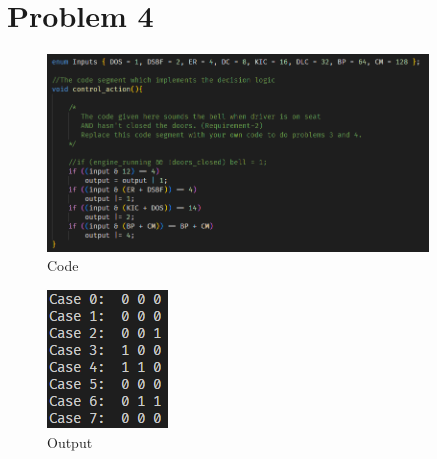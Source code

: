 \clearpage
\section*{Problem 4}
\begin{figure}[!ht]
    \centering
    \includegraphics[width=0.9\textwidth]{Images/4a Code.png}
    \caption{Code}
\end{figure}

\begin{figure}[!ht]
    \centering
    \includegraphics[]{Images/4a Output.png}
    \caption{Output}
\end{figure}
